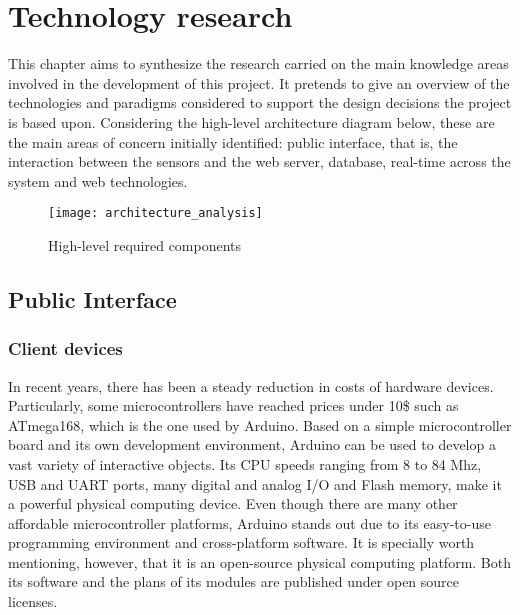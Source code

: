 \chapter{Technology research} \label{technology_research}

This chapter aims to synthesize the research carried on the main knowledge areas involved in the development of this project. It pretends to give an overview of the technologies and paradigms considered to support the design decisions the project is based upon. Considering the high-level architecture diagram below, these are the main areas of concern initially identified: public interface, that is, the interaction between the sensors and the web server, database, real-time across the system and web technologies.

\begin{figure}[ht]
	\centering
	\texttt{[image: architecture\_analysis]}
	\caption{High-level required components}
	\label{fig:arch_analysis}
\end{figure}

\section{Public Interface}

\subsection{Client devices}

In recent years, there has been a steady reduction in costs of hardware devices. Particularly, some microcontrollers have reached prices under 10\$ such as ATmega168, which is the one used by Arduino. Based on a simple microcontroller board and its own development environment, Arduino can be used to develop a vast variety of interactive objects. Its CPU speeds ranging from 8 to 84 Mhz, USB and UART ports, many digital and analog I/O and Flash memory, make it a powerful physical computing device. Even though there are many other affordable microcontroller platforms, Arduino stands out due to its easy-to-use programming environment and cross-platform software. It is specially worth mentioning, however, that it is an open-source physical computing platform. Both its software and the plans of its modules are published under open source licenses.

